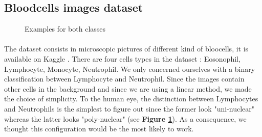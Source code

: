 \documentclass[10pt,a4paper]{article}
\begin{document}
\subsection{Bloodcells images dataset}

\begin{figure}[!tbp]\label{originals}
  \centering
  \hfill
  \caption{Examples for both classes}\label{originals}
\end{figure}


\paragraph{}
The dataset consists in microscopic pictures of different kind of bloocells, it is available on Kaggle \cite{3}. There are four cells types in the dataset : Eosonophil, Lymphocyte, Monocyte, Neutrophil. We only concerned ourselves with a binary classification between Lymphocyte and Neutrophil. Since the images contain other cells in the background and since we are using a linear method, we made the choice of simplicity. To the human eye, the distinction between Lymphocytes and Neutrophils is the simplest to figure out since the former look "uni-nuclear" whereas the latter looks "poly-nuclear" (see \textbf{Figure \ref{originals}}). As a consequence, we thought this configuration would be the most likely to work.
\end{document}
